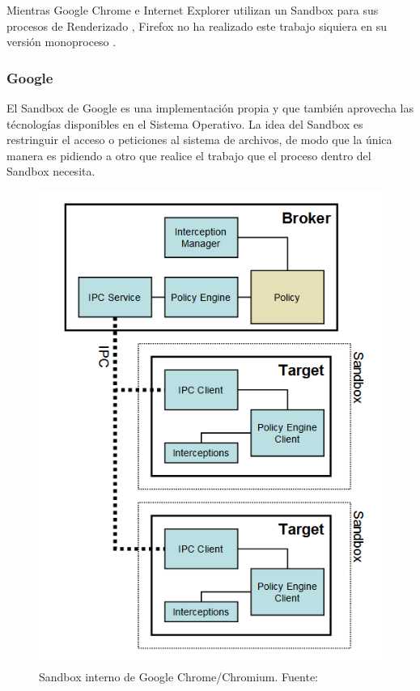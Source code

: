     Mientras Google Chrome e Internet Explorer utilizan un Sandbox para sus procesos de Renderizado \cite{sandboxGC}, Firefox no ha realizado este trabajo siquiera en su versión monoproceso \cite{NeckoElectro}.



    \subsubsection{Google}
        El Sandbox de Google es una implementación propia y que también aprovecha las técnologías disponibles en el Sistema Operativo. La idea del Sandbox es restringuir el acceso o peticiones al sistema de archivos, de modo que la única manera es pidiendo a otro que realice el trabajo que el proceso dentro del Sandbox necesita.

        \begin{figure}[h!t]
            \centering
            \includegraphics[scale=0.5]{figures/sbox_top_diagram.png}
            \caption{Sandbox interno de Google Chrome/Chromium. Fuente: \cite{sandboxGC}}
            \label{fig:SandboxGC}
        \end{figure}

